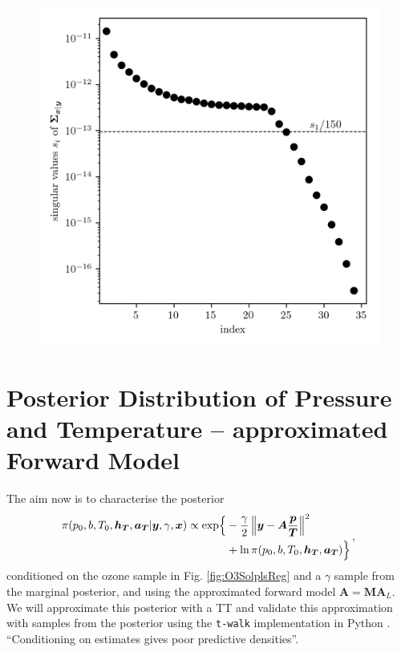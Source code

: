 \begin{figure}[ht!]
	\centering
	\includegraphics{CovSing.png}
	\caption[]{}
	\label{fig:}
\end{figure}

\clearpage

\section{Posterior Distribution of Pressure and Temperature -- approximated Forward Model}
\label{sec:postPT}

The aim now is to characterise the posterior
\begin{align}
	\begin{split}
		\pi(p_0,b,T_0,\bm{h_T},\bm{a_T} | \bm{y}, \gamma, \bm{x}) \propto  \exp\Bigl\{ & -\frac{\gamma}{2} \left\Vert \bm{y}- \bm{A} \frac{\bm{p}}{\bm{T}}  \right\Vert^2 \\ &+ \ln{\pi(p_0,b,T_0,\bm{h_T},\bm{a_T}) \Bigr\}  }
	\end{split} \, ,
	\label{eq:postPT}
\end{align}
conditioned on the ozone sample in Fig. \ref{fig:O3SolplsReg} and a $\gamma$ sample from the marginal posterior, and using the approximated forward model $\bm{A} = \bm{M}\bm{A}_L$.
We will approximate this posterior with a TT and validate this approximation with samples from the posterior using the \texttt{t-walk} \cite{christen2010general} implementation in Python \cite{christentwalkaccess}.
“Conditioning
on estimates gives poor predictive densities”.
\cite{tan2016LecNot}

